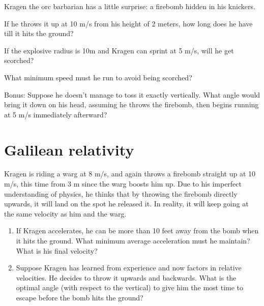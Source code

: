 \documentclass[12pt,letterpaper]{article}
\begin{document}
Kragen the orc barbarian has a little surprise:
a firebomb hidden in his knickers.

If he throws it up at 10 m/s from his height of 2 meters,
how long does he have till it hits the ground?

If the explosive radius is 10m and Kragen can sprint at 5 m/s, will he get scorched?

What minimum speed must he run to avoid being scorched?

Bonus:
Suppose he doesn't manage to toss it exactly vertically. 
What angle would bring it down on his head,
assuming he throws the firebomb,
then begins running at 5 m/s immediately afterward?

\section{Galilean relativity}

Kragen is riding a warg at 8 m/s,
and again throws a firebomb straight up at 10 m/s,
this time from 3 m since the warg boosts him up.
Due to his imperfect understanding of physics,
he thinks that by throwing the firebomb directly upwards,
it will land on the spot he released it.
In reality, it will keep going at the same velocity as him and the warg.

\begin{enumerate}
\item If Kragen accelerates, he can be more than 10 feet away from the bomb when it hits the ground. What minimum average acceleration must he maintain? What is his final velocity?
\item Suppose Kragen has learned from experience and now factors in relative velocities. He decides to throw it upwards and backwards. What is the optimal angle (with respect to the vertical) to give him the most time to escape before the bomb hits the ground?
\end{enumerate}
\end{document}
